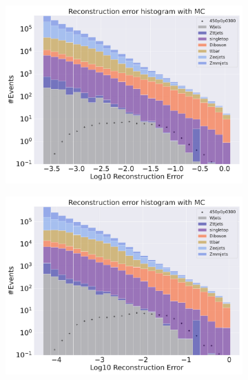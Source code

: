 \begin{figure}
    \centering
    \begin{subfigure}{.45\textwidth}
        \includegraphics[width=\textwidth]{Figures/AE_testing/big/2lep/b_data_recon_big_rm3_feats_sig_450p0p0300_.pdf}
        \caption{ }
        \label{fig:AE_2lep_big_450}
    \end{subfigure}
    \hfill
    \begin{subfigure}{.45\textwidth}
        \includegraphics[width=\textwidth]{Figures/AE_testing/small/2lep/b_data_recon_big_rm3_feats_sig_450p0p0300_.pdf}
        \caption{}
        \label{fig:AE_2lep_small_450}
    \end{subfigure}
    \hfill
    \begin{subfigure}{.45\textwidth}

\end{subfigure}
\end{figure}
